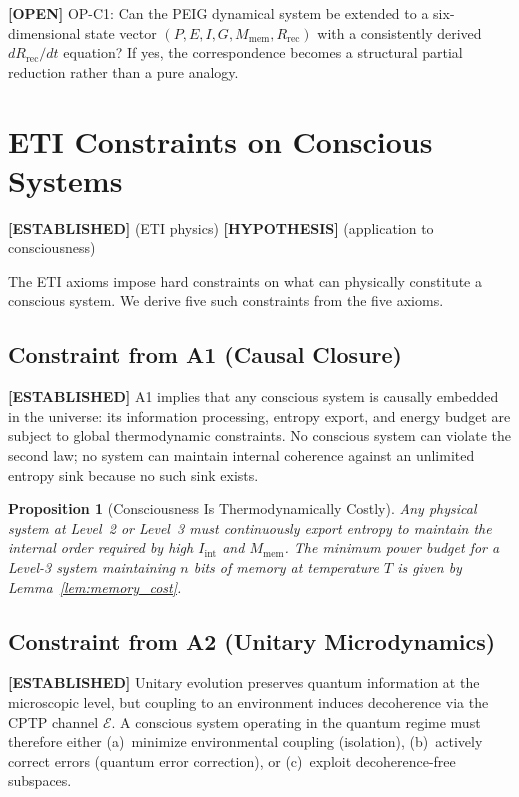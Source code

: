 \documentclass[12pt,letterpaper]{article}
\newtheorem{proposition}{Proposition}[section]
\newcommand{\ESTABLISHED}[1]{\textcolor{green!50!black}{\textbf{[ESTABLISHED]}} #1}
\newcommand{\HYPOTHESIS}[1]{\textcolor{blue!70!black}{\textbf{[HYPOTHESIS]}} #1}
\newcommand{\OPEN}[1]{\textcolor{red!70!black}{\textbf{[OPEN]}} #1}
\newcommand{\Iint}{I_{\mathrm{int}}}
\newcommand{\Mmem}{M_{\mathrm{mem}}}
\newcommand{\Rrec}{R_{\mathrm{rec}}}
\begin{document}
\OPEN{OP-C1: Can the PEIG dynamical system be extended to a six-dimensional
state vector $(P, E, I, G, \Mmem, \Rrec)$ with a consistently derived
$d\Rrec/dt$ equation? If yes, the correspondence becomes a structural
partial reduction rather than a pure analogy.}

\section{ETI Constraints on Conscious Systems}
\label{sec:eti}

\ESTABLISHED{} (ETI physics) \HYPOTHESIS{} (application to consciousness)

The ETI axioms impose hard constraints on what can physically constitute
a conscious system. We derive five such constraints from the five axioms.

\subsection{Constraint from A1 (Causal Closure)}

\ESTABLISHED{} A1 implies that any conscious system is causally embedded in
the universe: its information processing, entropy export, and energy budget
are subject to global thermodynamic constraints. No conscious system can
violate the second law; no system can maintain internal coherence against
an unlimited entropy sink because no such sink exists.

\begin{proposition}[Consciousness Is Thermodynamically Costly]
\label{prop:thermo_cost}
Any physical system at Level~2 or Level~3 must continuously export entropy
to maintain the internal order required by high $\Iint$ and $\Mmem$.
The minimum power budget for a Level-3 system maintaining $n$ bits of memory
at temperature $T$ is given by Lemma~\ref{lem:memory_cost}.
\end{proposition}

\subsection{Constraint from A2 (Unitary Microdynamics)}

\ESTABLISHED{} Unitary evolution preserves quantum information at the
microscopic level, but coupling to an environment induces decoherence via
the CPTP channel $\mathcal{E}$. A conscious system operating in the
quantum regime must therefore either (a)~minimize environmental coupling
(isolation), (b)~actively correct errors (quantum error correction), or
(c)~exploit decoherence-free subspaces.
\end{document}

